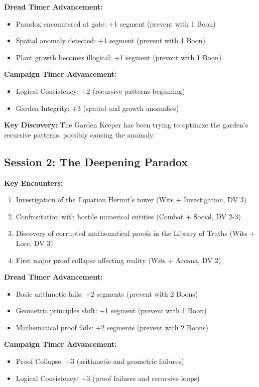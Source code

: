 \documentclass[11pt]{article}
\begin{document}
\textbf{Dread Timer Advancement:}
\begin{itemize}
\item Paradox encountered at gate: +1 segment (prevent with 1 Boon)
\item Spatial anomaly detected: +1 segment (prevent with 1 Boon)
\item Plant growth becomes illogical: +1 segment (prevent with 1 Boon)
\end{itemize}

\textbf{Campaign Timer Advancement:}
\begin{itemize}
\item Logical Consistency: +2 (recursive patterns beginning)
\item Garden Integrity: +3 (spatial and growth anomalies)
\end{itemize}

\textbf{Key Discovery:} The Garden Keeper has been trying to optimize the garden's recursive patterns, possibly causing the anomaly.

\subsection{Session 2: The Deepening Paradox}

\textbf{Key Encounters:}
\begin{enumerate}
\item Investigation of the Equation Hermit's tower (Wits + Investigation, DV 3)
\item Confrontation with hostile numerical entities (Combat + Social, DV 2-3)
\item Discovery of corrupted mathematical proofs in the Library of Truths (Wits + Lore, DV 3)
\item First major proof collapse affecting reality (Wits + Arcana, DV 2)
\end{enumerate}

\textbf{Dread Timer Advancement:}
\begin{itemize}
\item Basic arithmetic fails: +2 segments (prevent with 2 Boons)
\item Geometric principles shift: +1 segment (prevent with 1 Boon)
\item Mathematical proof fails: +2 segments (prevent with 2 Boons)
\end{itemize}

\textbf{Campaign Timer Advancement:}
\begin{itemize}
\item Proof Collapse: +3 (arithmetic and geometric failures)
\item Logical Consistency: +3 (proof failures and recursive loops)
\end{itemize}
\end{document}
